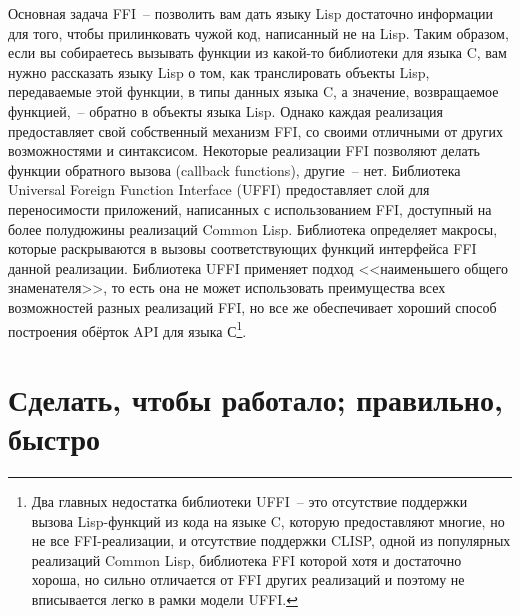 Основная задача FFI~-- позволить вам дать языку Lisp достаточно информации для того, чтобы
прилинковать чужой код, написанный не на Lisp. Таким образом, если вы собираетесь вызывать
функции из какой-то библиотеки для языка C, вам нужно рассказать языку Lisp о том, как
транслировать объекты Lisp, передаваемые этой функции, в типы данных языка C, а значение,
возвращаемое функцией,~-- обратно в объекты языка Lisp. Однако каждая реализация
предоставляет свой собственный механизм FFI, со своими отличными от других возможностями и
синтаксисом. Некоторые реализации FFI позволяют делать функции обратного вызова (callback
functions), другие~-- нет. Библиотека Universal Foreign Function Interface (UFFI)
предоставляет слой для переносимости приложений, написанных с использованием FFI,
доступный на более полудюжины реализаций Common Lisp. Библиотека определяет макросы,
которые раскрываются в вызовы соответствующих функций интерфейса FFI данной
реализации. Библиотека UFFI применяет подход <<наименьшего общего знаменателя>>, то есть
она не может использовать преимущества всех возможностей разных реализаций FFI, но все же
обеспечивает хороший способ построения обёрток API для языка С\footnote{Два главных
  недостатка библиотеки UFFI~-- это отсутствие поддержки вызова Lisp-функций из кода на
  языке C, которую предоставляют многие, но не все FFI-реализации, и отсутствие поддержки
  CLISP, одной из популярных реализаций Common Lisp, библиотека FFI которой хотя и
  достаточно хороша, но сильно отличается от FFI других реализаций и поэтому не
  вписывается легко в рамки модели UFFI.}.

\section{Сделать, чтобы работало; правильно, быстро}

